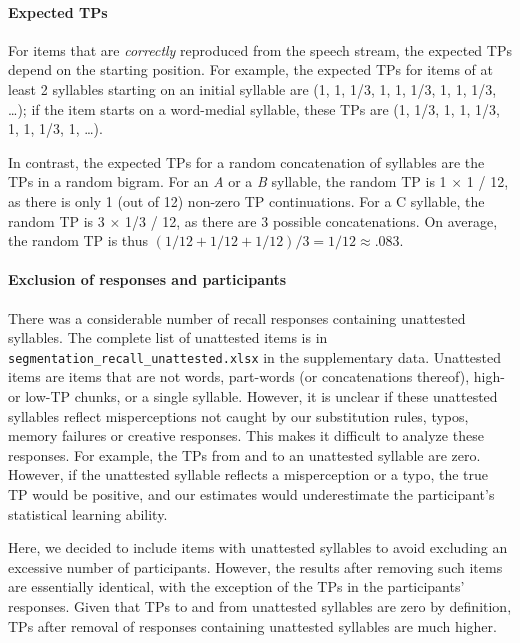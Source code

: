 \documentclass[
]{article}
\begin{document}
\paragraph{Expected TPs}\label{expected-tps}

For items that are \emph{correctly} reproduced from the speech stream,
the expected TPs depend on the starting position. For example, the
expected TPs for items of at least 2 syllables starting on an initial
syllable are (1, 1, 1/3, 1, 1, 1/3, 1, 1, 1/3, \ldots); if the item
starts on a word-medial syllable, these TPs are (1, 1/3, 1, 1, 1/3, 1,
1, 1/3, 1, \ldots).

In contrast, the expected TPs for a random concatenation of syllables
are the TPs in a random bigram. For an \emph{A} or a \emph{B} syllable,
the random TP is 1 \(\times\) 1 / 12, as there is only 1 (out of 12)
non-zero TP continuations. For a C syllable, the random TP is 3
\(\times\) 1/3 / 12, as there are 3 possible concatenations. On average,
the random TP is thus \((1/12 + 1/12 + 1/12)/ 3 = 1/12 \approx .083\).

\paragraph{Exclusion of responses and
participants}\label{exclusion-of-responses-and-participants}

There was a considerable number of recall responses containing
unattested syllables. The complete list of unattested items is in
\texttt{segmentation\_recall\_unattested.xlsx} in the supplementary
data. Unattested items are items that are not words, part-words (or
concatenations thereof), high- or low-TP chunks, or a single syllable.
However, it is unclear if these unattested syllables reflect
misperceptions not caught by our substitution rules, typos, memory
failures or creative responses. This makes it difficult to analyze these
responses. For example, the TPs from and to an unattested syllable are
zero. However, if the unattested syllable reflects a misperception or a
typo, the true TP would be positive, and our estimates would
underestimate the participant's statistical learning ability.

Here, we decided to include items with unattested syllables to avoid
excluding an excessive number of participants. However, the results
after removing such items are essentially identical, with the exception
of the TPs in the participants' responses. Given that TPs to and from
unattested syllables are zero by definition, TPs after removal of
responses containing unattested syllables are much higher.
\end{document}
